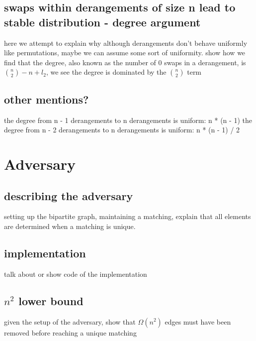 \documentclass{article}
\begin{document}
\subsection{swaps within derangements of size n lead to stable distribution - degree argument}
here we attempt to explain why although derangements don't behave uniformly
like permutations, maybe we can assume some sort of uniformity. 
show how we find that the
degree, also known as the number of 0 swaps in a derangement, is ${n \choose 2} - n + l_2 $, 
we see the degree is dominated by the ${n \choose 2}$ term
\subsection{other mentions?}
the degree from n - 1 derangements to n derangements is uniform: n * (n - 1)
the degree from n - 2 derangements to n derangements is uniform: n * (n - 1) / 2

\section{Adversary}
\subsection{describing the adversary}
setting up the bipartite graph, maintaining a matching, explain that all elements
are determined when a matching is unique.
\subsection{implementation}
talk about or show code of the implementation
\subsection{$n^2$ lower bound}
given the setup of the adversary, show that $\Omega(n^2)$ edges must have been removed 
before reaching a unique matching
\end{document}
